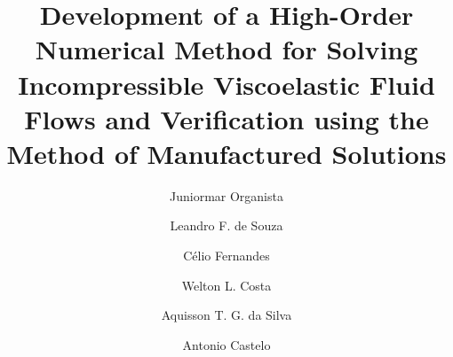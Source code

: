\documentclass[preprint, 12pt]{elsarticle}
\begin{document}
\begin{frontmatter}




\title{Development of a High-Order Numerical Method for Solving Incompressible Viscoelastic Fluid Flows and Verification using the Method of Manufactured Solutions}


\author[1]{Juniormar Organista}
\author[1]{Leandro F. de Souza}
\author[2,3]{Célio Fernandes}
\author[1]{Welton L. Costa}
\author[1]{Aquisson T. G. da Silva}
\author[1]{Antonio Castelo}


\end{frontmatter}
\end{document}
